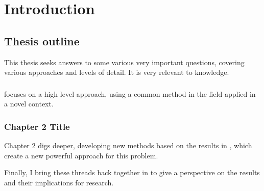 \chapter{Introduction}\label{chapter:introduction}
\chapfigures{}

\lipsum[4-6] %

\section{Thesis outline}

This thesis seeks answers to some various very important questions, covering various approaches and levels of detail.
It is very relevant to \hsapiens{} knowledge.

\subsection{}

 focuses on a high level approach, using a common method in the field applied in a novel context.

\subsection{Chapter 2 Title} %

Chapter 2 digs deeper, developing new methods based on the results in , which create a new powerful approach for this problem.

Finally, I bring these threads back together in  to give a perspective on the results and their implications for research.